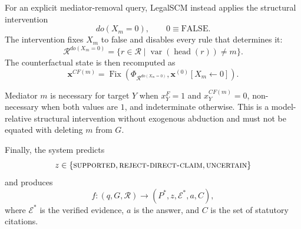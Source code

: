 For an explicit mediator-removal query, LegalSCM instead applies the structural
intervention \cite{pearl2009causality}
\begin{equation}
do(X_m=0),\qquad 0\equiv\mathrm{FALSE}.
\end{equation}
The intervention fixes $X_m$ to false and disables every rule that determines
it:
\begin{equation}
\mathcal{R}^{do(X_m=0)}
=
\{r\in\mathcal{R}\mid
\operatorname{var}(\operatorname{head}(r))\neq m\}.
\end{equation}
The counterfactual state is then recomputed as
\begin{equation}
\mathbf{x}^{CF(m)}
=
\operatorname{Fix}\!\left(
\Phi_{\mathcal{R}^{do(X_m=0)}},
\mathbf{x}^{(0)}[X_m\leftarrow0]
\right).
\label{eq:cf_fixed_point}
\end{equation}

Mediator $m$ is necessary for target $Y$ when $x_Y^{F}=1$ and
$x_Y^{CF(m)}=0$, non-necessary when both values are $1$, and indeterminate
otherwise. This is a model-relative structural intervention without exogenous
abduction and must not be equated with deleting $m$ from $G$.

Finally, the system predicts
\begin{equation}
z\in\{
\textsc{supported},
\textsc{reject-direct-claim},
\textsc{uncertain}
\}
\end{equation}
and produces
\begin{equation}
f:(q,G,\mathcal{R})
\rightarrow(P^*,z,\mathcal{E}^*,a,C),
\end{equation}
where $\mathcal{E}^*$ is the verified evidence, $a$ is the answer, and $C$ is
the set of statutory citations.
